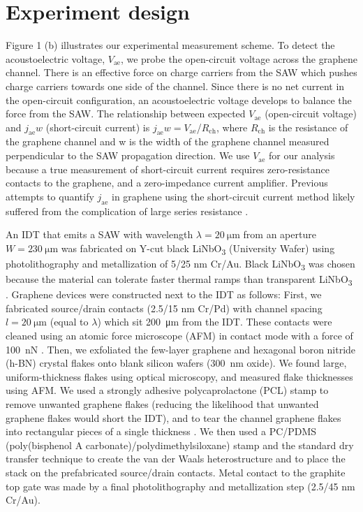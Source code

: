 \documentclass[double,12pt,1in,seploa]{beavtex}
\let\Oldsection\section
\renewcommand{\section}{\FloatBarrier\Oldsection}
\begin{document}
\section{Experiment design} \label{charge pumping paper experiment design}
Figure 1 (b) illustrates our experimental measurement scheme. To detect the acoustoelectric voltage, $V_{\mathrm{ae}}$, we probe the open-circuit voltage across the graphene channel. There is an effective force on charge carriers from the SAW which pushes charge carriers towards one side of the channel.  Since there is no net current in the open-circuit configuration, an acoustoelectric voltage develops to balance the force from the SAW. The relationship between expected $V_{\mathrm{ae}}$ (open-circuit voltage) and $j_{\mathrm{ae}}w$ (short-circuit current) is $j_{\mathrm{ae}}w = V_{\mathrm{ae}}$/$R_{\mathrm{ch}}$, where $R_{\mathrm{ch}}$ is the resistance of the graphene channel and w is the width of the graphene channel measured perpendicular to the SAW propagation direction. We use $V_{\mathrm{ae}}$ for our analysis because a true measurement of short-circuit current requires zero-resistance contacts to the graphene, and a zero-impedance current amplifier. Previous attempts to quantify $j_{\mathrm{ae}}$ in graphene using the short-circuit current method likely suffered from the complication of large series resistance \cite{bandhu_macroscopic_2013,bandhu_controlling_2016,okuda_acoustic_2016,tang_ultra-low_2017,okuda_graphene_2018}. 

An IDT that emits a SAW with wavelength $\lambda =  \SI{20}{\micro\meter}$ from an aperture $W = \SI{230}{\micro\meter}$ was fabricated on Y-cut black LiNbO\textsubscript{3} (University Wafer) using photolithography and metallization of 5/25 nm Cr/Au. Black LiNbO\textsubscript{3} was chosen because the material can tolerate faster thermal ramps than transparent LiNbO\textsubscript{3}  \cite{fang_quantum_2023,lane_flip-chip_2018}. Graphene devices were constructed next to the IDT as follows: First, we fabricated source/drain contacts (2.5/15 nm Cr/Pd) with channel spacing $l = \SI{20}{\micro\meter}$ (equal to $\lambda$) which sit \SI{200}{\micro\meter} from the IDT. These contacts were cleaned using an atomic force microscope (AFM) in contact mode with a force of \SI{100}{\nano\newton} \cite{goossens_mechanical_2012}. Then, we exfoliated the few-layer graphene and hexagonal boron nitride (h-BN) crystal flakes onto blank silicon wafers (\SI{300}{\nano\meter} oxide). We found large, uniform-thickness flakes using optical microscopy, and measured flake thicknesses using AFM. We used a strongly adhesive polycaprolactone (PCL) stamp to remove unwanted graphene flakes (reducing the likelihood that unwanted graphene flakes would short the IDT), and to tear the channel graphene flakes into rectangular pieces of a single thickness \cite{son_strongly_2020}. We then used a PC/PDMS (poly(bisphenol A carbonate)/polydimethylsiloxane) stamp and the standard dry transfer technique \cite{wang_one-dimensional_2013} to create the van der Waals heterostructure and to place the stack on the prefabricated source/drain contacts. Metal contact to the graphite top gate was made by a final photolithography and metallization step (2.5/45 nm Cr/Au).
\end{document}

